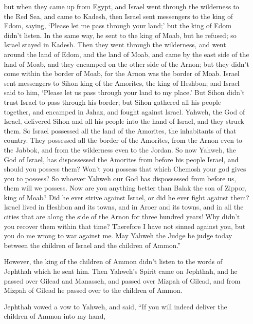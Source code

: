 {but when they came up from Egypt, and Israel went through the wilderness to the Red Sea, and came to Kadesh,
then Israel sent messengers to the king of Edom, saying, ‘Please let me pass through your land;’ but the king of Edom didn’t listen. In the same way, he sent to the king of Moab, but he refused; so Israel stayed in Kadesh.
Then they went through the wilderness, and went around the land of Edom, and the land of Moab, and came by the east side of the land of Moab, and they encamped on the other side of the Arnon; but they didn’t come within the border of Moab, for the Arnon was the border of Moab.
Israel sent messengers to Sihon king of the Amorites, the king of Heshbon; and Israel said to him, ‘Please let us pass through your land to my place.’
But Sihon didn’t trust Israel to pass through his border; but Sihon gathered all his people together, and encamped in Jahaz, and fought against Israel.
Yahweh, the God of Israel, delivered Sihon and all his people into the hand of Israel, and they struck them. So Israel possessed all the land of the Amorites, the inhabitants of that country.
They possessed all the border of the Amorites, from the Arnon even to the Jabbok, and from the wilderness even to the Jordan.
So now Yahweh, the God of Israel, has dispossessed the Amorites from before his people Israel, and should you possess them?
Won’t you possess that which Chemosh your god gives you to possess? So whoever Yahweh our God has dispossessed from before us, them will we possess.
Now are you anything better than Balak the son of Zippor, king of Moab? Did he ever strive against Israel, or did he ever fight against them?
Israel lived in Heshbon and its towns, and in Aroer and its towns, and in all the cities that are along the side of the Arnon for three hundred years! Why didn’t you recover them within that time?
Therefore I have not sinned against you, but you do me wrong to war against me. May Yahweh the Judge be judge today between the children of Israel and the children of Ammon.”
\par }{\PP {}However, the king of the children of Ammon didn’t listen to the words of Jephthah which he sent him.
Then Yahweh’s Spirit came on Jephthah, and he passed over Gilead and Manasseh, and passed over Mizpah of Gilead, and from Mizpah of Gilead he passed over to the children of Ammon.
\par }{\PP {}Jephthah vowed a vow to Yahweh, and said, “If you will indeed deliver the children of Ammon into my hand,
}
